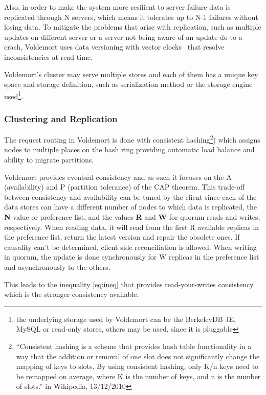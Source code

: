 Also, in order to make the system more resilient to server failure data is replicated through N servers, which means it tolerates up to N-1 failures without losing data. To mitigate the problems that arise with replication, such as multiple updates on different server or a server not being aware of an update do to a crash, Voldemort uses data versioning with vector clocks~\cite{fidge_vector_clocks_1988} that resolve inconsistencies at read time. 

Voldemort's cluster may serve multiple stores and each of them has a unique key space and storage definition, such as serialization method or the storage engine used\footnote{the underlying storage used by Voldemort can be the BerkeleyDB JE, MySQL or read-only stores, others may be used, since it is pluggable}.

\subsubsection{Clustering and Replication}

The request routing in Voldemort is done with consistent hashing\footnote{``Consistent hashing is a scheme that provides hash table functionality in a way that the addition or removal of one slot does not significantly change the mapping of keys to slots. By using consistent hashing, only K/n keys need to be remapped on average, where K is the number of keys, and n is the number of slots.'' in Wikipedia, 13/12/2010}) which assigns nodes to multiple places on the hash ring providing automatic load balance and ability to migrate partitions.

Voldemort provides eventual consistency and as such it focuses on the A (availability) and P (partition tolerance) of the CAP theorem. This trade-off between consistency and availability can be tuned by the client since each of the data stores can have a different number of nodes to which data is replicated, the \textbf{N} value or preference list, and the values \textbf{R} and \textbf{W} for quorum reads and writes, respectively. When reading data, it will read from the first R available replicas in the preference list, return the latest version and repair the obsolete ones. If causality can’t be determined, client side reconciliation is allowed. When writing in quorum, the update is done synchronously for W replicas in the preference list and asynchronously to the others.  

This leads to the inequality \ref{eq:ineq} that provides read-your-writes consistency which is the stronger consistency available.

